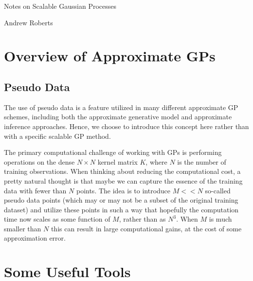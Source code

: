 \documentclass[12pt]{article}
\begin{document}
\begin{center}
\Large
Notes on Scalable Gaussian Processes
\end{center}

\begin{flushright}
Andrew Roberts
\end{flushright} 

\section{Overview of Approximate GPs}

\subsection{Pseudo Data}
The use of pseudo data is a feature utilized in many different approximate GP schemes, including both the approximate generative model and approximate inference approaches. Hence, we choose to introduce 
this concept here rather than with a specific scalable GP method.

The primary computational challenge of working with GPs is performing operations on the dense $N \times N$ kernel matrix $K$, where $N$ is the number of training observations. When thinking about 
reducing the computational cost, a pretty natural thought is that maybe we can capture the essence of the training data with fewer than $N$ points. The idea is to introduce 
$M << N$ so-called pseudo data points (which may or may not be a subset of the original training dataset) and utilize these points in such a way that hopefully the computation time now scales as some function 
of $M$, rather than as $N^3$. When $M$ is much smaller than $N$ this can result in large computational gains, at the cost of some approximation error.

\section{Some Useful Tools}

\end{document}
